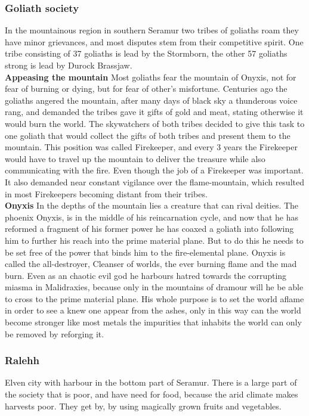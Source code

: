 \documentclass[a4paper]{article}
\begin{document}
\subsubsection{Goliath society}
In the mountainous region in southern Seramur two tribes of goliaths roam they have minor grievances, and most disputes stem from their competitive spirit. One tribe consisting of 37 goliaths is lead by the Stormborn, the other 57 goliaths strong is lead by Durock Brassjaw.
\\
\textbf{Appeasing the mountain}
Most goliaths fear the mountain of Onyxis, not for fear of burning or dying, but for fear of other's misfortune. Centuries ago the goliaths angered the mountain, after many days of black sky a thunderous voice rang, and demanded the tribes gave it gifts of gold and meat, stating otherwise it would burn the world. The skywatchers of both tribes decided to give this task to one goliath that would collect the gifts of both tribes and present them to the mountain. This position was called Firekeeper, and every 3 years the Firekeeper would have to travel up the mountain to deliver the treasure while also communicating with the fire. Even though the job of a Firekeeper was important. It also demanded near constant vigilance over the flame-mountain, which resulted in most Firekeepers becoming distant from their tribes. 
\\
\textbf{Onyxis}
In the depths of the mountain lies a creature that can rival deities. The phoenix Onyxis, is in the middle of his reincarnation cycle, and now that he has reformed a fragment of his former power he has coaxed a goliath into following him to further his reach into the prime material plane. But to do this he needs to be set free of the power that binds him to the fire-elemental plane. Onyxis is called the all-destroyer, Cleanser of worlds, the ever burning flame and the mad burn. Even as an chaotic evil god he harbours hatred towards the corrupting miasma in Malidraxies, because only in the mountains of dramour will he be able to cross to the prime material plane. His whole purpose is to set the world aflame in order to see a knew one appear from the ashes, only in this way can the world become stronger like most metals the impurities that inhabits the world can only be removed by reforging it.


\subsubsection{Ralehh}
Elven city with harbour in the bottom part of Seramur. There is a large part of the society that is poor, and have need for food, because the arid climate makes harvests poor. They get by, by using magically grown fruits and vegetables.
\end{document}
